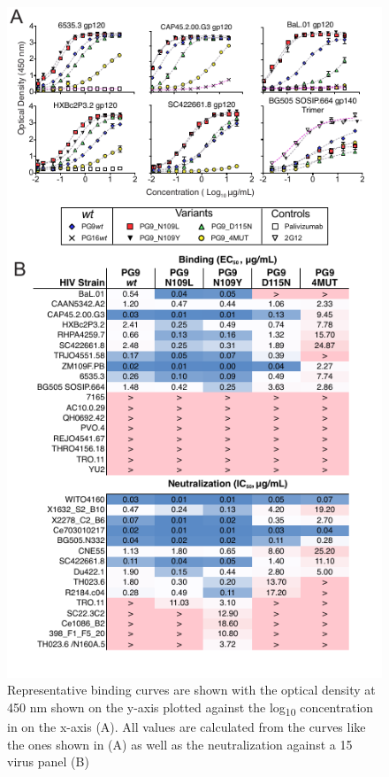 \begin{figure}[!t]
   \centering
   \includegraphics{images/chapter4/figure4_4.pdf} %
   \caption[Experimental analysis of PG9 Variants]{Representative binding curves are shown with the optical density at 450 nm shown on the y-axis plotted against the log\textsubscript{10} concentration in \mcml on the x-axis (A). All \ec values are calculated from the curves like the ones shown in (A) as well as the neutralization \ic against a 15 virus panel (B)}
   \label{fig:figure4_4}
\end{figure}



